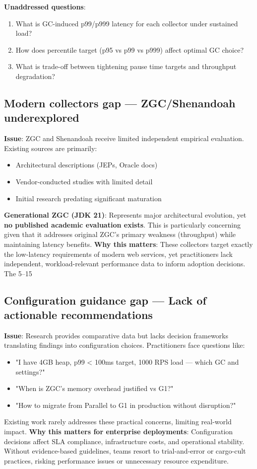 \textbf{Unaddressed questions}:
\begin{enumerate}
    \item What is GC-induced p99/p999 latency for each collector under sustained load?
    \item How does percentile target (p95 vs p99 vs p999) affect optimal GC choice?
    \item What is trade-off between tightening pause time targets and throughput degradation?
\end{enumerate}
\subsection{Modern collectors gap --- ZGC/Shenandoah underexplored}
\label{subsec:gap-modern}
\textbf{Issue}: ZGC and Shenandoah receive limited independent empirical evaluation. Existing sources are primarily:
\begin{itemize}
\item Architectural descriptions (JEPs, Oracle docs)
\item Vendor-conducted studies with limited detail
\item Initial research \cite{flood2016shenandoah} predating significant maturation
\end{itemize}
\textbf{Generational ZGC (JDK 21)}: Represents major architectural evolution, yet \textbf{no published academic evaluation exists}. This is particularly concerning given that it addresses original ZGC's primary weakness (throughput) while maintaining latency benefits.
\textbf{Why this matters}: These collectors target exactly the low-latency requirements of modern web services, yet practitioners lack independent, workload-relevant performance data to inform adoption decisions. The 5--15%
\subsection{Configuration guidance gap --- Lack of actionable recommendations}
\label{subsec:gap-guidance}
\textbf{Issue}: Research provides comparative data but lacks decision frameworks translating findings into configuration choices. Practitioners face questions like:
\begin{itemize}
\item "I have 4GB heap, p99 < 100ms target, 1000 RPS load --- which GC and settings?"
\item "When is ZGC's memory overhead justified vs G1?"
\item "How to migrate from Parallel to G1 in production without disruption?"
\end{itemize}
Existing work rarely addresses these practical concerns, limiting real-world impact.
\textbf{Why this matters for enterprise deployments}: Configuration decisions affect SLA compliance, infrastructure costs, and operational stability. Without evidence-based guidelines, teams resort to trial-and-error or cargo-cult practices, risking performance issues or unnecessary resource expenditure.
